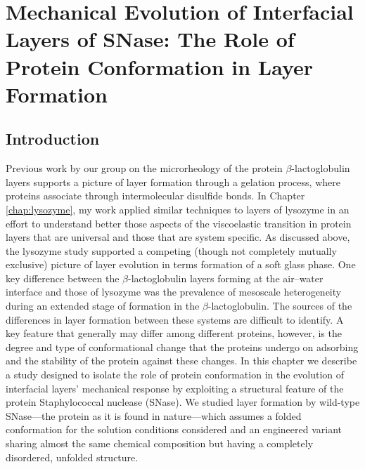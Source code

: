 \chapter{\label{chap:snase}Mechanical Evolution of Interfacial Layers of SNase: The Role of Protein Conformation in Layer Formation}

\section{Introduction}

Previous work by our group on the microrheology of the protein $\beta$-lactoglobulin layers\cite{Lee2010} supports a picture of layer formation through a gelation process, where proteins associate through intermolecular disulfide bonds. In Chapter \ref{chap:lysozyme}, my work applied similar techniques to layers of lysozyme in an effort to understand better those aspects of the viscoelastic transition in protein layers that are universal and those that are system specific. As discussed above, the lysozyme study supported a competing (though not completely mutually exclusive) picture of layer evolution in terms formation of a soft glass phase. One key difference between the $\beta$-lactoglobulin layers forming at the air--water interface and those of lysozyme was the prevalence of mesoscale heterogeneity during an extended stage of formation in the $\beta$-lactoglobulin. The sources of the differences in layer formation between these systems are difficult to identify. A key feature that generally may differ among different proteins, however, is the degree and type of conformational change that the proteins undergo on adsorbing and the stability of the protein against these changes. In this chapter we describe a study designed to isolate the role of protein conformation in the evolution of interfacial layers' mechanical response by exploiting a structural feature of the protein Staphylococcal nuclease (SNase). We studied layer formation by wild-type SNase---the protein as it is found in nature---which assumes a folded conformation for the solution conditions considered and an engineered variant sharing almost the same chemical composition but having a completely disordered, unfolded structure.

